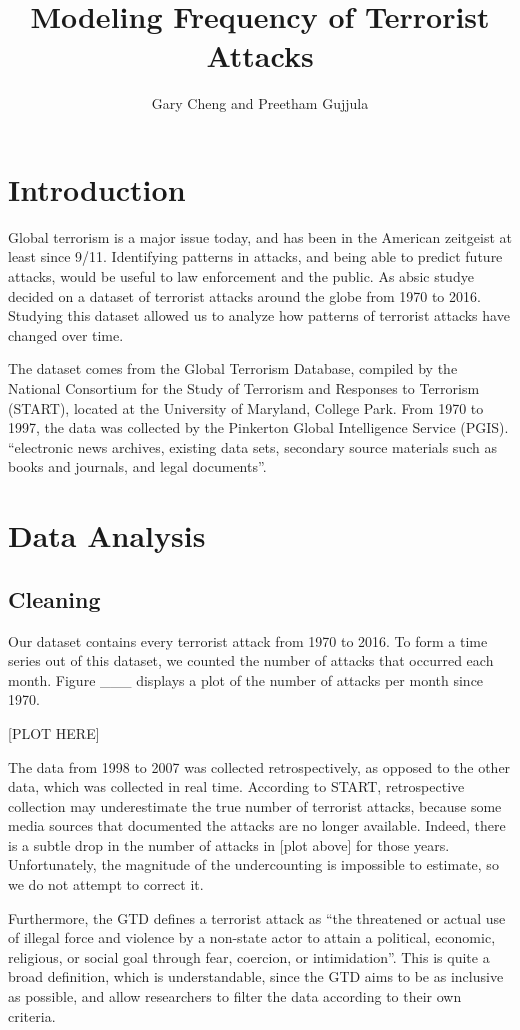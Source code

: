 \documentclass[font=12pt]{paper}
\title{Modeling Frequency of Terrorist Attacks}
\author{Gary Cheng and Preetham Gujjula}
\begin{document}
\maketitle 

\section{Introduction}
Global terrorism is a major issue today, and has been in the American zeitgeist at least since 9/11. Identifying patterns in attacks, and being able to predict future attacks, would be useful to law enforcement and the public. As absic studye decided on a dataset of terrorist attacks around the globe from 1970 to 2016. Studying this dataset allowed us to analyze how patterns of terrorist attacks have changed over time.

The dataset comes from the Global Terrorism Database, compiled by the National Consortium for the Study of Terrorism and Responses to Terrorism (START), located at the University of Maryland, College Park. From 1970 to 1997, the data was collected by the Pinkerton Global Intelligence Service (PGIS). “electronic news archives, existing data sets, secondary source materials such as books and journals, and legal documents”. 


\section{Data Analysis}
\subsection{Cleaning}
Our dataset contains every terrorist attack from 1970 to 2016. To form a time series out of this dataset, we counted the number of attacks that occurred each month. Figure ___ displays a plot of the number of attacks per month since 1970.

[PLOT HERE]

The data from 1998 to 2007 was collected retrospectively, as opposed to the other data, which was collected in real time. According to START, retrospective collection may underestimate the true number of terrorist attacks, because some media sources that documented the attacks are no longer available. Indeed, there is a subtle drop in the number of attacks in [plot above] for those years. Unfortunately, the magnitude of the undercounting is impossible to estimate, so we do not attempt to correct it.

Furthermore, the GTD defines a terrorist attack as “the threatened or actual use of illegal force and violence by a non-state actor to attain a political, economic, religious, or social goal through fear, coercion, or intimidation”. This is quite a broad definition, which is understandable, since the GTD aims to be as inclusive as possible, and allow researchers to filter the data according to their own criteria.
\end{document}
